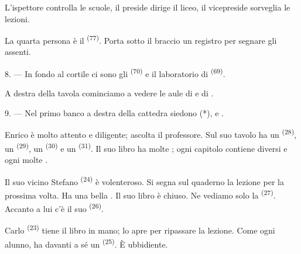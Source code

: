 L'ispettore controlla le scuole, il preside dirige il liceo, il vicepreside
sorveglia le lezioni.

La quarta persona è il  \textsuperscript{(77)}. Porta sotto il
braccio un registro per segnare gli assenti.

8. --- In fondo al cortile ci sono gli 
\textsuperscript{(70)} e il laboratorio di 
\textsuperscript{(69)}.

A destra della tavola cominciamo a vedere le aule di  e di
.


\VUsaut{2.4mm}

\VUsaut{3.0mm}

9. --- Nel primo banco a destra della cattedra siedono  (*),
 e .

Enrico è molto attento e diligente; ascolta il professore. Sul suo tavolo ha un
 \textsuperscript{(28)}, un  \textsuperscript{(29)},
un  \textsuperscript{(30)} e un 
\textsuperscript{(31)}. Il suo libro ha molte ; ogni capitolo contiene
diversi  e ogni  molte .

Il suo vicino Stefano \textsuperscript{(24)} è volenteroso. Si segna sul quaderno la
lezione per la prossima volta. Ha una bella . Il suo libro è
chiuso. Ne vediamo solo la  \textsuperscript{(27)}. Accanto a lui
c'è il suo  \textsuperscript{(26)}.

Carlo \textsuperscript{(23)} tiene il libro in mano; lo apre per ripassare la lezione.
Come ogni alunno, ha davanti a sé un  \textsuperscript{(25)}. È
ubbidiente.

